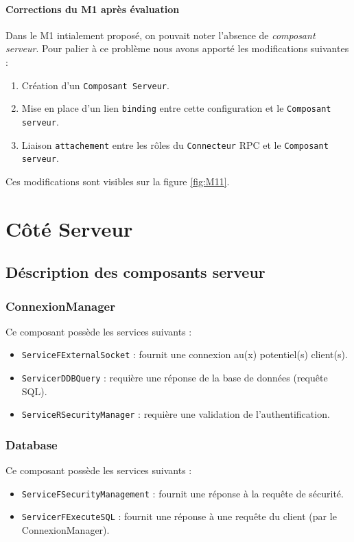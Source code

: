 \paragraph{Corrections du M1 après évaluation}
Dans le M1 intialement proposé, on pouvait noter l'absence de \textit{composant serveur}. Pour palier à ce problème nous avons apporté les modifications suivantes : 
\begin{enumerate}
\item Création d'un \verb+Composant Serveur+.
\item Mise en place d'un lien \verb+binding+ entre cette configuration et le \verb+Composant serveur+.
\item Liaison \verb+attachement+ entre les rôles du  \verb+Connecteur+ RPC et le \verb+Composant serveur+.
\end{enumerate}

Ces modifications sont visibles sur la figure \ref{fig:M11}.

\section{Côté Serveur}
\subsection{Déscription des composants serveur}
\subsubsection{ConnexionManager}
Ce composant possède les services suivants : 
\begin{itemize}
\item 
  \verb+ServiceFExternalSocket+ : fournit une connexion au(x) potentiel(s) client(s).
\item 
  \verb+ServicerDDBQuery+ :  requière une réponse de la base de données (requête SQL).
\item 
  \verb+ServiceRSecurityManager+ :  requière une validation de l'authentification.
\end{itemize}

\subsubsection{Database}
Ce composant possède les services suivants : 
\begin{itemize}
\item 
  \verb+ServiceFSecurityManagement+ :  fournit une réponse à la requête de sécurité.
\item 
  \verb+ServicerFExecuteSQL+ :  fournit une réponse à une requête du client (par le ConnexionManager).
\end{itemize}

